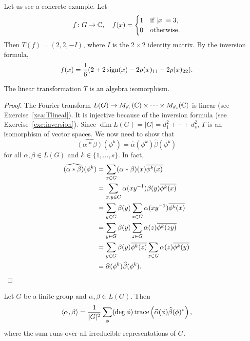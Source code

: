 \begin{example}
  Let us see a concrete example. Let
  \[
  f\colon G\to\mathbb{C},\quad 
    f(x)=\begin{cases}
    1 & \text{if $|x|=3$},\\
    0 & \text{otherwise.}
  \end{cases}
  \]
  Then $T(f)=(2,2,-I)$, where $I$ is the $2\times 2$ identity matrix. By the inversion formula, 
  \[
	f(x)=\frac16(2+2\operatorname{sign}(x)-2\rho(x)_{11}-2\rho(x)_{22}).
  \]
\end{example}

\begin{theorem}[Wedderburn]
  The linear transformation $T$ is an algebra isomorphism.  
\end{theorem}

\begin{proof}
  The Fourier transform $L(G)\to M_{d_1}(\mathbb{C})\times\cdots\times
  M_{d_s}(\mathbb{C})$ is linear (see Exercise~\ref{xca:Tlineal}). It is injective because of 
  the inversion formula (see Exercise~\ref{exe:inversion}). Since $\dim L(G)=|G|=d_1^2+\cdots+d_s^2$, $T$
  is an isomorphism of vector spaces. We now need to show that 
  \[
    \widehat{(\alpha*\beta)}(\phi^k)=\widehat{\alpha}(\phi^k)\widehat{\beta}(\phi^k)
  \]
  for all $\alpha,\beta\in L(G)$ and $k\in\{1,\dots,s\}$. In fact, 
  \begin{align*}
    \widehat{(\alpha*\beta)}(\phi^k) &= \sum_{x\in G}(\alpha*\beta)(x)\overline{\phi^k(x)}\\
    &=\sum_{x,y\in G}\alpha(xy^{-1})\beta(y)\overline{\phi^k(x)}\\
    &=\sum_{y\in G}\beta(y)\sum_{x\in G}\alpha(xy^{-1})\overline{\phi^k(x)}\\
  &=\sum_{y\in G}\beta(y)\sum_{z\in G}\alpha(z)\overline{\phi^k(zy)}\\
  &=\sum_{y\in G}\beta(y)\overline{\phi^k(z)}\sum_{z\in G}\alpha(z)\overline{\phi^k(y)}\\
  &=\widehat{\alpha}(\phi^k)\widehat{\beta}(\phi^k).\qedhere 
  \end{align*}
\end{proof}

\begin{theorem}[Plancherel]
  Let $G$ be a finite group and $\alpha,\beta\in L(G)$. Then 
  \[
	\langle \alpha,\beta\rangle
	=\frac{1}{|G|^2}\sum_{\phi}(\deg\phi)\operatorname{trace}\left(\widehat{\alpha}(\phi)\widehat{\beta}(\phi)^*\right),
  \]
  where the sum runs over all irreducible representations of $G$.
\end{theorem}

